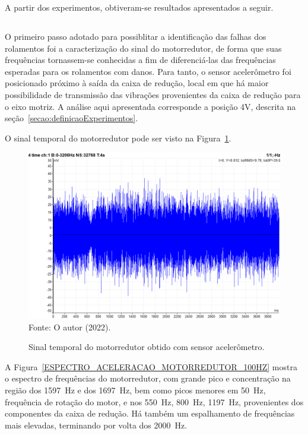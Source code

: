\documentclass[
	12pt,				
	oneside,			
	a4paper,			
	english,			
	brazil,	
	sumario=abnt-6027-2012		
	]{abntex2ppgsi}
\begin{document}
A partir dos experimentos, obtiveram-se resultados apresentados a seguir.

\subsection{}

O primeiro passo adotado para possiblitar a identificação das falhas dos rolamentos foi a caracterização do sinal do motorredutor, de forma que suas frequências tornassem-se conhecidas a fim de diferenciá-las das frequências esperadas para os rolamentos com danos. Para tanto, o sensor acelerômetro foi posicionado próximo à saída da caixa de redução, local em que há maior possibilidade de transmissão das vibrações provenientes da caixa de redução para o eixo motriz. A análise aqui apresentada corresponde a posição 4V, descrita na seção~\ref{secao:definicaoExperimentos}.

O sinal temporal do motorredutor pode ser visto na Figura~\ref{MOTORREDUTOR_TEMPORAL_ACELEROMETRO}.

\begin{figure}[H]
\centering
\caption {Sinal temporal do motorredutor obtido com sensor acelerômetro.}
\includegraphics[width=\textwidth,keepaspectratio]{MOTORREDUTOR_TEMPORAL_ACELEROMETRO} \\
Fonte: O autor (2022).
\label{MOTORREDUTOR_TEMPORAL_ACELEROMETRO}
\end{figure}

A Figura~\ref{ESPECTRO_ACELERACAO_MOTORREDUTOR_100HZ} mostra o espectro de frequências do motorredutor, com grande pico e concentração na região dos \SI{1597}{\hertz} e dos \SI{1697}{\hertz}, bem como picos menores em \SI{50}{\hertz}, frequência de rotação do motor, e nos \SI{550}{\hertz}, \SI{800}{\hertz}, \SI{1197}{\hertz}, provenientes dos componentes da caixa de redução.  Há também um espalhamento de frequências mais elevadas, terminando por volta dos \SI{2000}{\hertz}.
\end{document}

